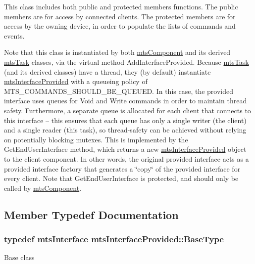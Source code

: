 This class includes both public and protected members functions. The public members are for access by connected clients. The protected members are for access by the owning device, in order to populate the lists of commands and events.

Note that this class is instantiated by both \hyperlink{classmts_component}{mts\+Component} and its derived \hyperlink{classmts_task}{mts\+Task} classes, via the virtual method Add\+Interface\+Provided. Because \hyperlink{classmts_task}{mts\+Task} (and its derived classes) have a thread, they (by default) instantiate \hyperlink{classmts_interface_provided}{mts\+Interface\+Provided} with a queueing policy of M\+T\+S\+\_\+\+C\+O\+M\+M\+A\+N\+D\+S\+\_\+\+S\+H\+O\+U\+L\+D\+\_\+\+B\+E\+\_\+\+Q\+U\+E\+U\+E\+D. In this case, the provided interface uses queues for Void and Write commands in order to maintain thread safety. Furthermore, a separate queue is allocated for each client that connects to this interface -- this ensures that each queue has only a single writer (the client) and a single reader (this task), so thread-\/safety can be achieved without relying on potentially blocking mutexes. This is implemented by the Get\+End\+User\+Interface method, which returns a new \hyperlink{classmts_interface_provided}{mts\+Interface\+Provided} object to the client component. In other words, the original provided interface acts as a provided interface factory that generates a \char`\"{}copy\char`\"{} of the provided interface for every client. Note that Get\+End\+User\+Interface is protected, and should only be called by \hyperlink{classmts_component}{mts\+Component}. 

\subsection{Member Typedef Documentation}
\hypertarget{classmts_interface_provided_a7c7eb6689ef61272efe9bfcabeecdbc6}{}
\subsubsection[{Base\+Type}]{\setlength{\rightskip}{0pt plus 5cm}typedef {\bf mts\+Interface} {\bf mts\+Interface\+Provided\+::\+Base\+Type}}\label{classmts_interface_provided_a7c7eb6689ef61272efe9bfcabeecdbc6}
Base class \hypertarget{classmts_interface_provided_afbea756c205cd50db2a0884681ad650a}{}
